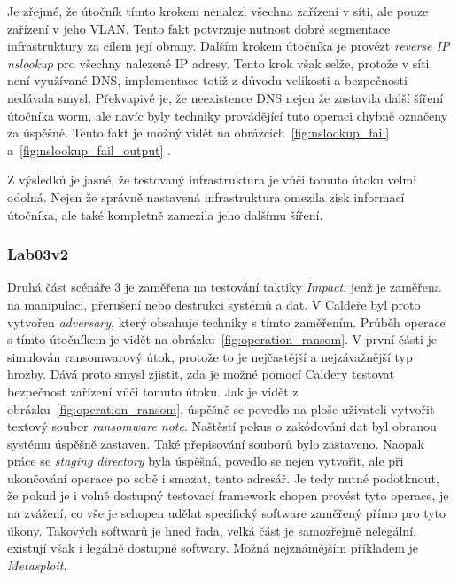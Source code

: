 
Je zřejmé, že útočník tímto krokem nenalezl všechna zařízení v síti, ale pouze zařízení v jeho \ac{VLAN}.
Tento fakt potvrzuje nutnost dobré segmentace infrastruktury za cílem její obrany.
Dalším krokem útočníka je provézt \textit{reverse IP nslookup} pro všechny nalezené IP adresy.
Tento krok však selže, protože v síti není využívané \ac{DNS}, implementace totiž z důvodu velikosti a bezpečnosti nedávala smysl.
Překvapivé je, že neexistence \ac{DNS} nejen že zastavila další šíření útočníka worm, ale navíc byly techniky provádějící tuto operaci chybně označeny za úspěšné.
Tento fakt je možný vidět na obrázcích~\ref{fig:nslookup_fail} a~\ref{fig:nslookup_fail_output} .


Z výsledků je jasné, že testovaný infrastruktura je vůči tomuto útoku velmi odolná.
Nejen že správně nastavená infrastruktura omezila zisk informací útočníka, ale také kompletně zamezila jeho dalšímu šíření.

\subsubsection{Lab03v2}
Druhá část scénáře 3 je zaměřena na testování taktiky \textit{Impact}, jenž je zaměřena na manipulaci, přerušení nebo destrukci systémů a dat.
V Caldeře byl proto vytvořen \textit{adversary}, který obsahuje techniky s tímto zaměřením.
Průběh operace s tímto útočníkem je vidět na obrázku~\ref{fig:operation_ransom}.
V první části je simulován ransomwarový útok, protože to je nejčastější a nejzávažnější typ hrozby.
Dává proto smysl zjistit, zda je možné pomocí Caldery testovat bezpečnost zařízení vůči tomuto útoku.
Jak je vidět z obrázku~\ref{fig:operation_ransom}, úspěšně se povedlo na ploše uživateli vytvořit textový soubor \textit{ransomware note}.
Naštěstí pokus o zakódování dat byl obranou systému úspěšně zastaven.
Také přepisování souborů bylo zastaveno.
Naopak práce se \textit{staging directory} byla úspěšná, povedlo se nejen vytvořit, ale při ukončování operace po sobě i smazat, tento adresář.
Je tedy nutné podotknout, že pokud je i volně dostupný testovací framework chopen provést tyto operace, je na zvážení, co vše je schopen udělat specifický software zaměřený přímo pro tyto úkony.
Takových softwarů je hned řada, velká část je samozřejmě nelegální, existují však i legálně dostupné softwary.
Možná nejznámějším příkladem je \textit{Metasploit}\cite{metasploit}.

